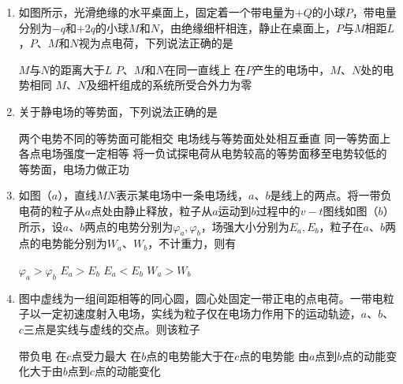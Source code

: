 \begin{enumerate}[leftmargin=0em]
\item
{}
如图所示，光滑绝缘的水平桌面上，固定着一个带电量为$ +Q $的小球$ P $，带电量分别为$ -q $和$ +2q $的小球$ M $和$ N $，由绝缘细杆相连，静止在桌面上，$ P $与$ M $相距$ L $，$ P $、$ M $和$ N $视为点电荷，下列说法正确的是	  
\begin{figure}[h!]
\centering

\end{figure}


\fourchoices
{$ M $与$ N $的距离大于$ L $}
{$ P $、$ M $和$ N $在同一直线上}
{在$ P $产生的电场中，$ M $、$ N $处的电势相同}
{$ M $、$ N $及细杆组成的系统所受合外力为零}



\item
{}
关于静电场的等势面，下列说法正确的是  


\fourchoices
{两个电势不同的等势面可能相交}
{电场线与等势面处处相互垂直}
{同一等势面上各点电场强度一定相等}
{将一负试探电荷从电势较高的等势面移至电势较低的等势面，电场力做正功}




\item
{}
如图（$ a $），直线$ MN $表示某电场中一条电场线，$ a $、$ b $是线上的两点。将一带负电荷的粒子从$ a $点处由静止释放，粒子从$ a $运动到$ b $过程中的$ v-t $图线如图（$ b $）所示，设$ a $、$ b $两点的电势分别为$\varphi _ { a } , \varphi _ { b }$，场强大小分别为$E _ { a } , E _ { b }$，粒子在$ a $、$ b $两点的电势能分别为$ W_{a} $、$ W_{b} $，不计重力，则有  
\begin{figure}[h!]
\centering

\end{figure}


\fourchoices
{$\varphi _ { a } > \varphi _ { b }$}
{$E _ { a } > E _ { b }$}
{$E _ { a } < E _ { b }$}
{$W _ { a } > W _ { b }$}




\item
{}
图中虚线为一组间距相等的同心圆，圆心处固定一带正电的点电荷。一带电粒子以一定初速度射入电场，实线为粒子仅在电场力作用下的运动轨迹，$ a $、$ b $、$ c $三点是实线与虚线的交点。则该粒子  
\begin{figure}[h!]
\centering

\end{figure}


\fourchoices
{带负电}
{在$ c $点受力最大}
{在$ b $点的电势能大于在$ c $点的电势能}
{由$ a $点到$ b $点的动能变化大于由$ b $点到$ c $点的动能变化}






\end{enumerate}
